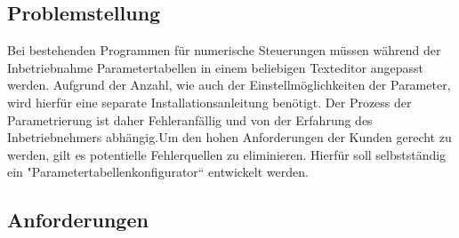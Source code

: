 \documentclass[10pt,a4paper]{article}
\begin{document}
\subsection{Problemstellung}
Bei bestehenden Programmen für numerische Steuerungen müssen während der Inbetriebnahme Parametertabellen in einem beliebigen Texteditor angepasst werden. Aufgrund der Anzahl, wie auch der Einstellmöglichkeiten der Parameter, wird hierfür eine separate Installationsanleitung benötigt. Der Prozess der Parametrierung ist daher Fehleranfällig und von der Erfahrung des Inbetriebnehmers abhängig.Um den hohen Anforderungen der Kunden gerecht zu werden, gilt es potentielle Fehlerquellen zu eliminieren. Hierfür soll selbstständig ein "Parametertabellenkonfigurator“ entwickelt werden.\newpage
\subsection{Anforderungen}
 
\end{document}
